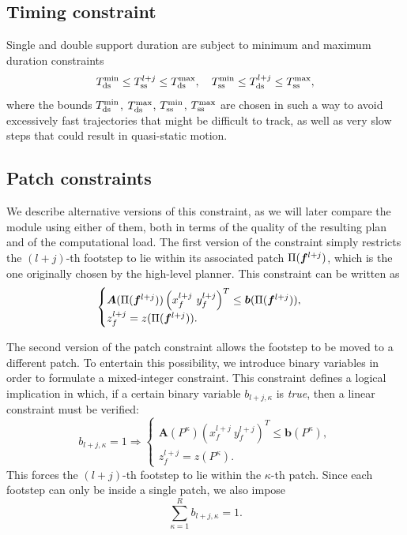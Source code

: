 \subsection{Timing constraint}
Single and double support duration are subject to minimum and maximum duration
constraints
\begin{equation}
    T_{\rm ds}^{\min} \le T_{\rm ss}^{l+j} \le T_{\rm ds}^{\max}, \quad T_{\rm ss}^{\min} \le T_{\rm ds}^{l+j} \le T_{\rm ss}^{\max},
    \label{eq:FAPA:timing-constraint}
\end{equation}
where the bounds $T_{\rm ds}^{\min}$, $T_{\rm ds}^{\max}$, $T_{\rm ss}^{\min}$, $T_{\rm ss}^{\max}$ are chosen in such a way to avoid excessively fast trajectories that might be difficult to track, as well as very slow steps that could result in quasi-static motion.

\subsection{Patch constraints}
\label{sec:FAPA:patch_constraint}
We describe alternative versions of this constraint, as we will later compare
the module using either of them, both in terms of the quality of the resulting
plan and of the computational load.
The first version of the constraint simply restricts the $(l+j)$-th footstep
to lie within its associated patch $\Pi({\bm{f}}^{l+j})$, which is the one
originally chosen by the high-level planner. This constraint can be written as
\begin{equation}
    \begin{cases}
		\bm{A}(\Pi({\bm{f}}^{l+j})) \left( x_f^{l+j} \ y_f^{l+j} \right)^T \leq \bm{b}(\Pi({\bm{f}}^{l+j})), \\
		z_f^{l+j} = z(\Pi({\bm{f}}^{l+j})).
    \end{cases}
	\label{eq:FAPA:fixed_patch_constraint}
\end{equation}

The second version of the patch constraint allows the footstep to be moved
to a different patch. To entertain this possibility, we introduce binary
variables in order to formulate a mixed-integer constraint. This constraint
defines a logical implication in which, if a certain binary variable
$b_{l+j,\kappa}$ is {\em true}, then a linear constraint must be verified:
\begin{equation}
	b_{l+j,\kappa}=1 \Rightarrow 
	\begin{cases}
		\bm{A}(P^\kappa) \left( x_f^{l+j} \ y_f^{l+j} \right)^T \leq \bm{b}(P^\kappa), \\
		z_f^{l+j} = z(P^\kappa).
	\end{cases}
	\label{eq:FAPA:implication}
\end{equation}
This forces the $(l+j)$-th footstep to lie within the $\kappa$-th patch.
Since each footstep can only be inside a single patch, we also impose
\begin{equation}
    \sum^R_{\kappa=1} b_{l+j,\kappa} = 1.
    \label{eq:FAPA:sum_one}
\end{equation}


